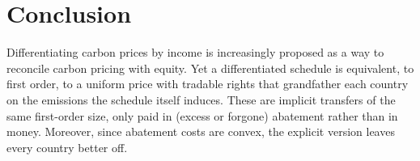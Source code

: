 \documentclass[12pt,english]{article}
\theoremstyle{remark}
\begin{document}

\FloatBarrier

\section{Conclusion}
\label{sec:conclusion}

Differentiating carbon prices by income is increasingly proposed as a way to reconcile carbon pricing with equity. %
Yet a differentiated schedule is equivalent, to first order, to a uniform price with tradable rights that grandfather each country on the emissions the schedule itself induces. These are implicit transfers of the same first-order size, only paid in (excess or forgone) abatement rather than in money. 
Moreover, since abatement costs are convex, the explicit version leaves every country better off.
\end{document}
